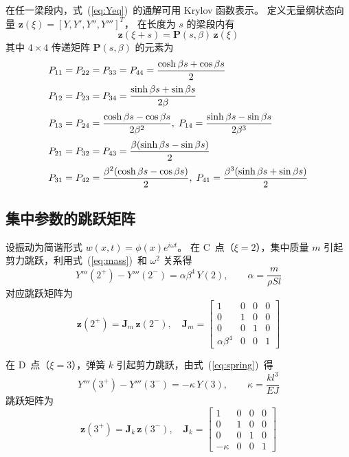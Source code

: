 \documentclass[twoside,12pt]{ctexart}
\begin{document}
在任一梁段内，式~(\ref{eq:Yeq})~的通解可用 Krylov 函数表示。
定义无量纲状态向量 $\mathbf{z}(\xi)=[Y,Y',Y'',Y''']^T$，
在长度为 $s$ 的梁段内有
\begin{equation}\label{eq:transfer}
  \mathbf{z}(\xi+s)=\mathbf{P}(s,\beta)\,\mathbf{z}(\xi)
\end{equation}
其中 $4\times 4$ 传递矩阵 $\mathbf{P}(s,\beta)$ 的元素为
\begin{align}
  P_{11}&=P_{22}=P_{33}=P_{44}=\frac{\cosh\beta s+\cos\beta s}{2}\notag\\[2pt]
  P_{12}&=P_{23}=P_{34}=\frac{\sinh\beta s+\sin\beta s}{2\beta}\notag\\[2pt]
  P_{13}&=P_{24}=\frac{\cosh\beta s-\cos\beta s}{2\beta^2},\;
  P_{14}=\frac{\sinh\beta s-\sin\beta s}{2\beta^3}\notag\\[2pt]
  P_{21}&=P_{32}=P_{43}=\frac{\beta(\sinh\beta s-\sin\beta s)}{2}\notag\\[2pt]
  P_{31}&=P_{42}=\frac{\beta^2(\cosh\beta s-\cos\beta s)}{2},\;
  P_{41}=\frac{\beta^3(\sinh\beta s+\sin\beta s)}{2}\notag
\end{align}

\subsection{集中参数的跳跃矩阵}

设振动为简谐形式 $w(x,t)=\phi(x)e^{i\omega t}$。
在 C~点（$\xi=2$），集中质量 $m$ 引起剪力跳跃，利用式~(\ref{eq:mass})~和 $\omega^2$ 关系得
\begin{equation}\label{eq:Jm_cond}
  Y'''(2^+)-Y'''(2^-)=\alpha\beta^4\,Y(2),\qquad \alpha=\frac{m}{\rho S l}
\end{equation}
对应跳跃矩阵为
\begin{equation}\label{eq:Jm}
  \mathbf{z}(2^+)=\mathbf{J}_m\,\mathbf{z}(2^-),\quad
  \mathbf{J}_m=\begin{bmatrix}
    1&0&0&0\\0&1&0&0\\0&0&1&0\\ \alpha\beta^4&0&0&1
  \end{bmatrix}
\end{equation}

在 D~点（$\xi=3$），弹簧 $k$ 引起剪力跳跃，由式~(\ref{eq:spring})~得
\begin{equation}\label{eq:Jk_cond}
  Y'''(3^+)-Y'''(3^-)=-\kappa\,Y(3),\qquad \kappa=\frac{k l^3}{EJ}
\end{equation}
跳跃矩阵为
\begin{equation}\label{eq:Jk}
  \mathbf{z}(3^+)=\mathbf{J}_k\,\mathbf{z}(3^-),\quad
  \mathbf{J}_k=\begin{bmatrix}
    1&0&0&0\\0&1&0&0\\0&0&1&0\\ -\kappa&0&0&1
  \end{bmatrix}
\end{equation}
\end{document}
